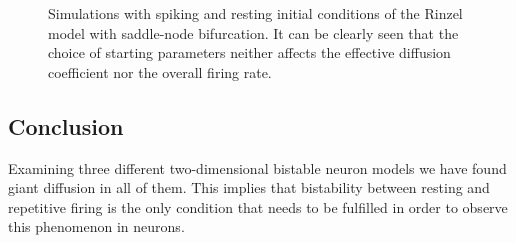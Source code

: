 \documentclass[12pt,a4paper]{article}
\begin{document}
\begin{figure}[H]
	\hspace*{-0.5cm}
	\caption{Simulations with spiking and resting initial conditions of the Rinzel model with saddle-node bifurcation. It can be clearly seen that the choice of starting parameters neither affects the effective diffusion coefficient nor the overall firing rate.}
	\label{icrinzel}
\end{figure}
\subsection{Conclusion}
Examining three different two-dimensional bistable neuron models we have found giant diffusion in all of them. This implies that bistability between resting and repetitive firing is the only condition that needs to be fulfilled in order to observe this phenomenon in neurons.
\newpage
\end{document}
